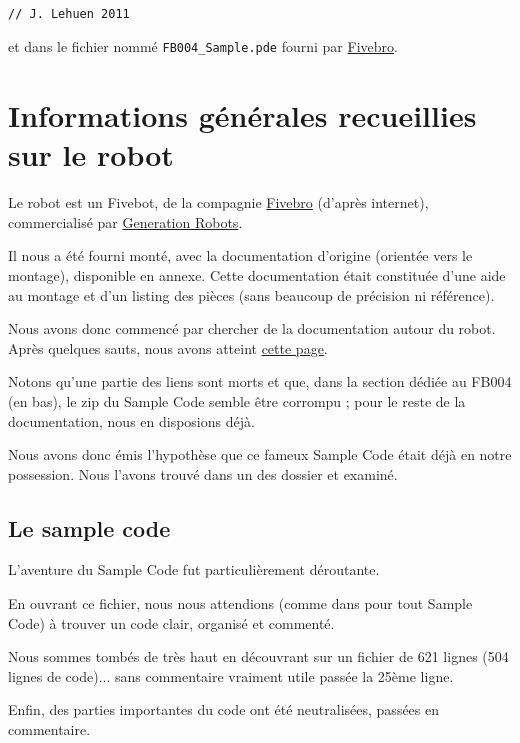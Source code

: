 \documentclass[a4paper]{report}
\begin{document}
\begin{verbatim}

// J. Lehuen 2011

\end{verbatim}

et dans le fichier nommé \texttt{FB004\_Sample.pde} fourni par \href{http://www.fivebro.com.tw/}{Fivebro}.


\section{Informations générales recueillies sur le robot%
  \label{informations-generales-recueillies-sur-le-robot}%
}

Le robot est un Fivebot, de la compagnie \href{http://www.fivebro.com.tw/}{Fivebro} (d'après internet), commercialisé par \href{http://www.generationrobots.com}{Generation Robots}.

Il nous a été fourni monté, avec la documentation d'origine (orientée vers le montage), disponible en annexe. Cette documentation était constituée d'une aide au montage et d'un listing des pièces (sans beaucoup de précision ni référence).

Nous avons donc commencé par chercher de la documentation autour du robot.
Après quelques sauts, nous avons atteint \href{http://www.fivebro.com.tw/download.htm}{cette page}.

Notons qu'une partie des liens sont morts et que, dans la section dédiée au FB004 (en bas), le zip du Sample Code semble être corrompu ; pour le reste de la documentation, nous en disposions déjà.

Nous avons donc émis l'hypothèse que ce fameux Sample Code était déjà en notre possession.
Nous l'avons trouvé dans un des dossier et examiné.


\subsection{Le sample code%
  \label{le-sample-code}%
}

L'aventure du Sample Code fut particulièrement déroutante.

En ouvrant ce fichier, nous nous attendions (comme dans pour tout Sample Code) à trouver un code clair, organisé et commenté.

Nous sommes tombés de très haut en découvrant sur un fichier de 621 lignes (504 lignes de code)... sans commentaire vraiment utile passée la 25ème ligne.

Enfin, des parties importantes du code ont été neutralisées, passées en commentaire.
\end{document}
